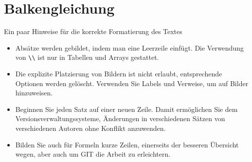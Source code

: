 %
%
%
%
\chapter{Balkengleichung\label{chapter:balken}}
\begin{refsection}

Ein paar Hinweise für die korrekte Formatierung des Textes
\begin{itemize}
\item
Absätze werden gebildet, indem man eine Leerzeile einfügt.
Die Verwendung von \verb+\\+ ist nur in Tabellen und Arrays gestattet.
\item
Die explizite Platzierung von Bildern ist nicht erlaubt, entsprechende
Optionen werden gelöscht. 
Verwenden Sie Labels und Verweise, um auf Bilder hinzuweisen.
\item
Beginnen Sie jeden Satz auf einer neuen Zeile. 
Damit ermöglichen Sie dem Versionsverwaltungssysteme, Änderungen
in verschiedenen Sätzen von verschiedenen Autoren ohne Konflikt 
anzuwenden.
\item 
Bilden Sie auch für Formeln kurze Zeilen, einerseits der besseren
Übersicht wegen, aber auch um GIT die Arbeit zu erleichtern.
\end{itemize}






\printbibliography[heading=subbibliography]
\end{refsection}
